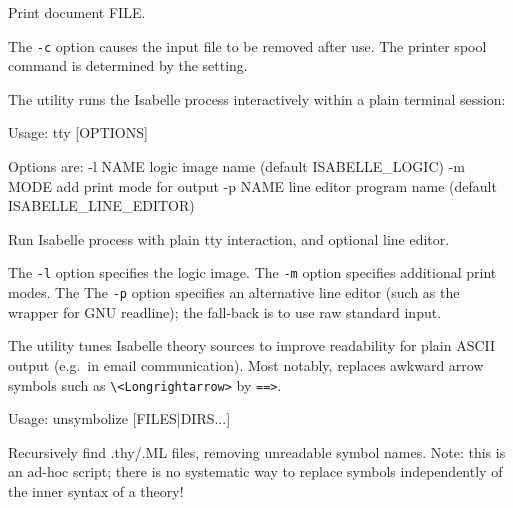 \begin{isabellebody}
\begin{isamarkuptext}
\begin{ttbox}
  Print document FILE.
\end{ttbox}

  The \verb|-c| option causes the input file to be removed
  after use.  The printer spool command is determined by the \hyperlink{setting.PRINT-COMMAND}{\mbox{}} setting.%
\end{isamarkuptext}%
\isamarkuptrue%
%
\isamarkuptrue%
%
\begin{isamarkuptext}%
The \hypertarget{tool.tty}{\hyperlink{tool.tty}{\mbox{}}} utility runs the Isabelle process interactively
  within a plain terminal session:
\begin{ttbox}
Usage: tty [OPTIONS]

  Options are:
    -l NAME      logic image name (default ISABELLE_LOGIC)
    -m MODE      add print mode for output
    -p NAME      line editor program name (default ISABELLE_LINE_EDITOR)

  Run Isabelle process with plain tty interaction, and optional line editor.
\end{ttbox}

  The \verb|-l| option specifies the logic image.  The
  \verb|-m| option specifies additional print modes.  The The
  \verb|-p| option specifies an alternative line editor (such
  as the \hyperlink{executable.rlwrap}{\mbox{}} wrapper for GNU readline); the fall-back
  is to use raw standard input.%
\end{isamarkuptext}%
\isamarkuptrue%
%
\isamarkuptrue%
%
\begin{isamarkuptext}%
The \hypertarget{tool.unsymbolize}{\hyperlink{tool.unsymbolize}{\mbox{}}} utility tunes Isabelle theory sources to
  improve readability for plain ASCII output (e.g.\ in email
  communication).  Most notably, \hyperlink{tool.unsymbolize}{\mbox{}} replaces awkward
  arrow symbols such as \verb|\|\verb|<Longrightarrow>|
  by \verb|==>|.
\begin{ttbox}
Usage: unsymbolize [FILES|DIRS...]

  Recursively find .thy/.ML files, removing unreadable symbol names.
  Note: this is an ad-hoc script; there is no systematic way to replace
  symbols independently of the inner syntax of a theory!


\end{ttbox}
\end{isamarkuptext}
\end{isabellebody}
